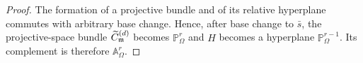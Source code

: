 \begin{proof}
The formation of a projective bundle and of its relative hyperplane commutes
with arbitrary base change. Hence, after base change to $\bar s$, the
projective-space bundle $\widetilde{C}_{\mathfrak{m}}^{(d)}$ becomes $\mathbb P^r_{\Omega}$ and $H$
becomes a hyperplane $\mathbb P^{r-1}_{\Omega}$. Its complement is therefore
$\mathbb A^r_{\Omega}$.
\end{proof}

